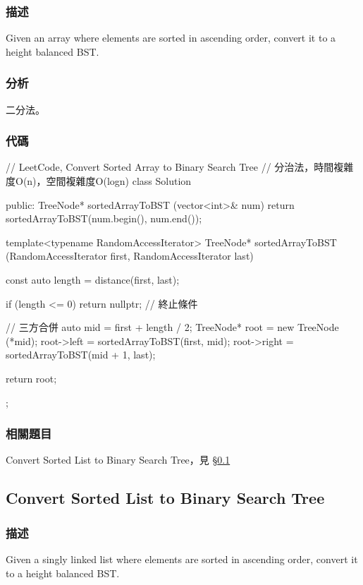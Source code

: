 \subsubsection{描述}
Given an array where elements are sorted in ascending order, convert it to a height balanced BST.


\subsubsection{分析}
二分法。


\subsubsection{代碼}

\begin{Code}
// LeetCode, Convert Sorted Array to Binary Search Tree
// 分治法，時間複雜度O(n)，空間複雜度O(logn)
class Solution {
public:
    TreeNode* sortedArrayToBST (vector<int>& num) {
        return sortedArrayToBST(num.begin(), num.end());
    }

    template<typename RandomAccessIterator>
    TreeNode* sortedArrayToBST (RandomAccessIterator first,
            RandomAccessIterator last) {
        const auto length = distance(first, last);

        if (length <= 0) return nullptr;  // 終止條件

        // 三方合併
        auto mid = first + length / 2;
        TreeNode* root = new TreeNode (*mid);
        root->left = sortedArrayToBST(first, mid);
        root->right = sortedArrayToBST(mid + 1, last);

        return root;
    }
};
\end{Code}


\subsubsection{相關題目}
\begindot
\item Convert Sorted List to Binary Search Tree，見 \S \ref{sec:convert-sorted-list-to-binary-search-tree}
\myenddot


\subsection{Convert Sorted List to Binary Search Tree}
\label{sec:convert-sorted-list-to-binary-search-tree}


\subsubsection{描述}
Given a singly linked list where elements are sorted in ascending order, convert it to a height balanced BST.


